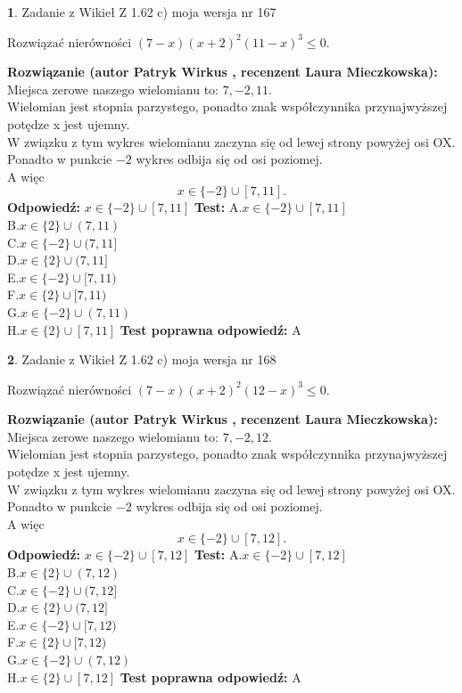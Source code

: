 \documentclass[12pt, a4paper]{article}
\theoremstyle{definition} %
\newtheorem{zad}{}
\newcommand{\zadStart}[1]{\begin{zad}#1\newline}
\newcommand{\zadStop}{\end{zad}}
\newcommand{\rozwStart}[2]{\noindent \textbf{Rozwiązanie (autor #1 , recenzent #2): }\newline}
\newcommand{\rozwStop}{\newline}
\newcommand{\odpStart}{\noindent \textbf{Odpowiedź:}\newline}
\newcommand{\odpStop}{\newline}
\newcommand{\testStart}{\noindent \textbf{Test:}\newline}
\newcommand{\testStop}{\newline}
\newcommand{\kluczStart}{\noindent \textbf{Test poprawna odpowiedź:}\newline}
\newcommand{\kluczStop}{\newline}
\begin{document}
\zadStart{Zadanie z Wikieł Z 1.62 c) moja wersja nr 167}

Rozwiązać nierówności $(7-x)(x+2)^{2}(11-x)^{3}\le0$.
\zadStop
\rozwStart{Patryk Wirkus}{Laura Mieczkowska}
Miejsca zerowe naszego wielomianu to: $7, -2, 11$.\\
Wielomian jest stopnia parzystego, ponadto znak współczynnika przy\linebreak najwyższej potędze x jest ujemny.\\ W związku z tym wykres wielomianu zaczyna się od lewej strony powyżej osi OX.\\
Ponadto w punkcie $-2$ wykres odbija się od osi poziomej.\\
A więc $$x \in \{-2\} \cup [7,11].$$
\rozwStop
\odpStart
$x \in \{-2\} \cup [7,11]$
\odpStop
\testStart
A.$x \in \{-2\} \cup [7,11]$\\
B.$x \in \{2\} \cup (7,11)$\\
C.$x \in \{-2\} \cup (7,11]$\\
D.$x \in \{2\} \cup (7,11]$\\
E.$x \in \{-2\} \cup [7,11)$\\
F.$x \in \{2\} \cup [7,11)$\\
G.$x \in \{-2\} \cup (7,11)$\\
H.$x \in \{2\} \cup [7,11]$
\testStop
\kluczStart
A
\kluczStop



\zadStart{Zadanie z Wikieł Z 1.62 c) moja wersja nr 168}

Rozwiązać nierówności $(7-x)(x+2)^{2}(12-x)^{3}\le0$.
\zadStop
\rozwStart{Patryk Wirkus}{Laura Mieczkowska}
Miejsca zerowe naszego wielomianu to: $7, -2, 12$.\\
Wielomian jest stopnia parzystego, ponadto znak współczynnika przy\linebreak najwyższej potędze x jest ujemny.\\ W związku z tym wykres wielomianu zaczyna się od lewej strony powyżej osi OX.\\
Ponadto w punkcie $-2$ wykres odbija się od osi poziomej.\\
A więc $$x \in \{-2\} \cup [7,12].$$
\rozwStop
\odpStart
$x \in \{-2\} \cup [7,12]$
\odpStop
\testStart
A.$x \in \{-2\} \cup [7,12]$\\
B.$x \in \{2\} \cup (7,12)$\\
C.$x \in \{-2\} \cup (7,12]$\\
D.$x \in \{2\} \cup (7,12]$\\
E.$x \in \{-2\} \cup [7,12)$\\
F.$x \in \{2\} \cup [7,12)$\\
G.$x \in \{-2\} \cup (7,12)$\\
H.$x \in \{2\} \cup [7,12]$
\testStop
\kluczStart
A
\kluczStop
\end{document}
